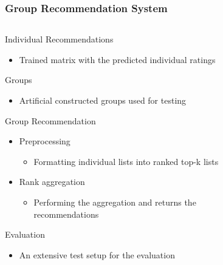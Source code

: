 \begin{frame}
\frametitle{Group Recommendation System}
\begin{columns}
	\begin{column}{0.55\textwidth}
		Individual Recommendations
		\begin{itemize}
			\small
			\item Trained matrix with the predicted individual ratings
			\normalsize
		\end{itemize}
		Groups
		\begin{itemize}
			\small
			\item Artificial constructed groups used for testing
			\normalsize
		\end{itemize}
		Group Recommendation
		\begin{itemize}
			\item Preprocessing 
			\begin{itemize}
				\item Formatting individual lists into ranked top-k lists
			\end{itemize}
			\item Rank aggregation 
			\begin{itemize}
				\item Performing the aggregation and returns the recommendations
			\end{itemize}
		\end{itemize}
		Evaluation
		\begin{itemize}
			\small
			\item An extensive test setup for the evaluation
			\normalsize
		\end{itemize}
	\end{column}
	\begin{column}{0.45\textwidth}
		\begin{figure}
			\centering

\end{figure}
\end{column}
\end{columns}
\end{frame}
